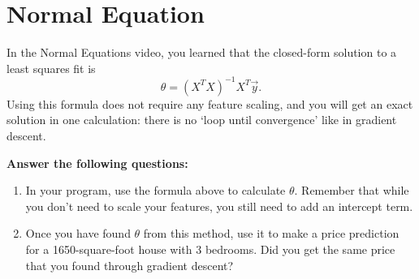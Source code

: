 \documentclass[10pt,a4paper]{article}
\begin{document}
\section{Normal Equation}
%
  In the Normal Equations video, you learned that the closed-form solution to a least squares fit is 
  \begin{displaymath}
    \theta=\left(X^{T}X\right)^{-1}X^{T}\vec{y}.
  \end{displaymath}
  Using this formula does not require any feature scaling, and you will get an exact solution in one calculation: there is no `loop until convergence' like in gradient descent.

  \textbf{Answer the following questions:}
  \begin{enumerate}
    \item In your program, use the formula above to calculate $\theta$. Remember that while you don't need to scale your features, you still need to add an intercept term.
    \item Once you have found $\theta$ from this method, use it to make a price prediction for a 1650-square-foot house with 3 bedrooms. Did you get the same price that you found through gradient descent?
  \end{enumerate}
\end{document}
